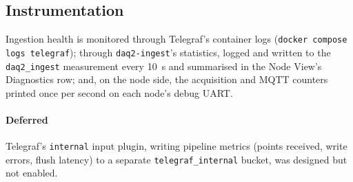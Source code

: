 \subsection{Instrumentation}
Ingestion health is monitored through Telegraf's container logs (\texttt{docker compose logs telegraf}); through \texttt{daq2-ingest}'s statistics, logged and written to the \texttt{daq2\_ingest} measurement every 10~s and summarised in the Node View's Diagnostics row; and, on the node side, the acquisition and MQTT counters printed once per second on each node's debug UART.

\paragraph{Deferred} Telegraf's \texttt{internal} input plugin, writing pipeline metrics (points received, write errors, flush latency) to a separate \texttt{telegraf\_internal} bucket, was designed but not enabled.
